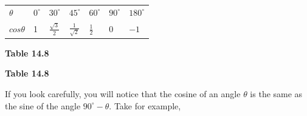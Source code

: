           \begin{table}[H]
        \begin{center}
      \label{m39414*id86909}
    \noindent
      \tablelasttail{}
      \begin{xtabular}[t]{|l|l|l|l|l|l|l|}\hline
                  $\theta $
                 &
                  ${0}^{\circ }$
                 &
                  ${30}^{\circ }$
                 &
                  ${45}^{\circ }$
                 &
                  ${60}^{\circ }$
                 &
                  ${90}^{\circ }$
                 &
                  ${180}^{\circ }$
     \tabularnewline{}
                  $cos\theta $
                 &
        1 &
                  $\frac{\sqrt{3}}{2}$
                 &
                  $\frac{1}{\sqrt{2}}$
                 &
                  $\frac{1}{2}$
                 &
        0 &
                  $-1$
     \tabularnewline{}
    \end{xtabular}
      \end{center}
    \begin{center}{\small\bfseries Table 14.8}\end{center}
    \begin{caption}{\small\bfseries Table 14.8}\end{caption}
\end{table}
    \par
        \label{m39414*id87173}If you look carefully, you will notice that the cosine of an angle $\theta $ is the same as the sine of the angle ${90}^{\circ }-\theta $. Take for example,\par 
        \label{m39414*id87206}\nopagebreak\noindent{}
          
